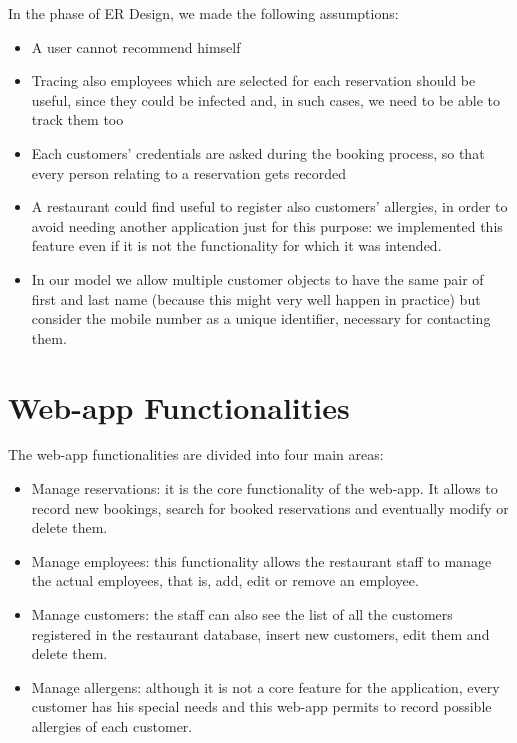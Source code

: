 \documentclass{article}
\begin{document}
\vspace{5mm}
In the phase of ER Design, we made the following assumptions:
\begin{itemize}
  \item A user cannot recommend himself
  \item Tracing also employees which are selected for each reservation should be useful, since they could be infected and, in such cases, we need to be able to track them too
  \item Each customers' credentials are asked during the booking process, so that every person relating to a reservation gets recorded
  \item A restaurant could find useful to register also customers' allergies, 
  in order to avoid needing another application just for this purpose: we implemented this feature even if it is not the functionality for which it was intended.
  \item In our model we allow multiple customer objects to have the same pair of
  first and last name (because this might very well happen in practice) but consider
  the mobile number as a unique identifier, necessary for contacting them.
\end{itemize}

\newpage

\section*{Web-app Functionalities}
The web-app functionalities are divided into four main areas:
\begin{itemize}
    \item Manage reservations: it is the core functionality of the web-app. It allows
      to record new bookings, search for booked reservations and eventually 
       modify or delete them.
    \item Manage employees: this functionality allows the restaurant staff to manage the actual employees, that is, add, edit or remove an employee.
    \item Manage customers: the staff can also see the list of all the customers registered in the restaurant database, insert new customers, edit them and delete them.
    \item Manage allergens: although it is not a core feature for the application, every customer has his special needs and this web-app permits to record possible allergies of each customer.
\end{itemize}
\end{document}
